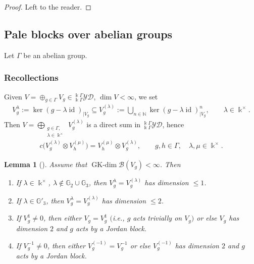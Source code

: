 \documentclass[10pt,a4paper]{amsart}
\numberwithin{equation}{section}
\newtheorem{Lemma}[Theorem]{Lemma}
\newcommand{\GK}{\operatorname{GK-dim}}
\newcommand{\id}{\operatorname{id}}
\newcommand{\toba}{\mathscr B}
\newcommand{\G}{{\mathbb G}}
\newcommand{\N}{{\mathbb N}}
\newcommand{\yd}[1]{{}_{#1}^{#1}\mathcal{YD}}
\begin{document}
\begin{proof}
Left to the reader.
\end{proof}

\subsection{Pale blocks over abelian groups}%
Let $\Gamma$ be an abelian group.

\subsubsection{Recollections}%
Given $V = \oplus_{g\in \Gamma} V_g \in \yd{\Bbbk\Gamma}$, $\dim V < \infty$, we set
\begin{gather*}
V_g^{\lambda} := \ker (g - \lambda \id)_{\vert V_g} \subseteq V_g^{(\lambda)}
:= \bigcup_{n\in \N} \ker (g - \lambda \id)^n_{\vert V_g}, \qquad
\lambda \in \Bbbk^{\times}.
\end{gather*}
Then $V = \bigoplus_{\substack{g\in \Gamma, \\ \lambda \in \Bbbk^{\times}}} V_g^{(\lambda)}$ is a direct sum in $\yd{\Bbbk\Gamma}$, hence
\begin{align*}
c\big(V_g^{(\lambda)} \otimes V_h^{(\mu)}\big) = V_h^{(\mu)} \otimes V_g^{(\lambda)}, \qquad
g, h \in \Gamma,\quad \lambda,\mu \in \Bbbk^{\times}.
\end{align*}

\begin{Lemma}[{\cite[Lemma 8.1.1]{AAH-triang}}]%
Assume that $\GK \toba(V_g)< \infty$. Then
\begin{enumerate}[label=$(\alph*)$]\itemsep=0pt
\item%
If $\lambda \in \Bbbk^{\times}$, $\lambda \notin \G_2 \cup \G_3$, then
$V_g^{\lambda} = V_g^{(\lambda)}$ has dimension $\leq 1$.

\item%
If $\lambda \in \G'_3$, then
$V_g^{\lambda} = V_g^{(\lambda)}$ has dimension $\leq 2$.

\item%
If $V_g^{1} \neq 0$, then either
$V_g = V_g^{1}$ $($i.e., $g$ acts trivially on $V_g)$ or else $V_g$ has dimension $2$ and $g$ acts by a Jordan block.

\item%
If $V_g^{-1} \neq 0$, then either
$V_g^{(-1)} = V_g^{-1}$ or else $V_g^{(-1)}$ has dimension $2$ and $g$ acts by a Jordan block.
\end{enumerate}
\end{Lemma}
\end{document}
